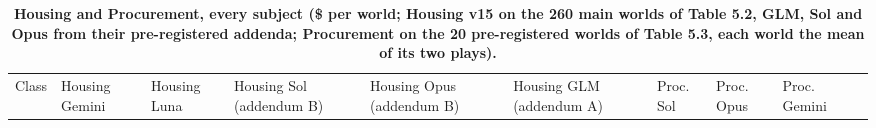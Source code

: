 \renewcommand{\thetable}{E.5}
\begin{longtable}[]{@{}
  >{\raggedright\arraybackslash}p{}
  >{\raggedleft\arraybackslash}p{}
  >{\raggedleft\arraybackslash}p{}
  >{\raggedleft\arraybackslash}p{}
  >{\raggedleft\arraybackslash}p{}
  >{\raggedleft\arraybackslash}p{}
  >{\raggedleft\arraybackslash}p{}
  >{\raggedleft\arraybackslash}p{}
  >{\raggedleft\arraybackslash}p{}
  >{\raggedleft\arraybackslash}p{}@{}}
\caption{\textbf{Housing and Procurement, every subject (\$ per world; Housing v15 on the 260 main worlds of Table 5.2, GLM, Sol and Opus from their pre-registered addenda; Procurement on the 20 pre-registered worlds of Table 5.3, each world the mean of its two plays).}}\label{tab:E.5}\tabularnewline
\toprule\noalign{}
\begin{minipage}[b]{\linewidth}\raggedright
Class
\end{minipage} & \begin{minipage}[b]{\linewidth}\raggedleft
Housing Gemini
\end{minipage} & \begin{minipage}[b]{\linewidth}\raggedleft
Housing Luna
\end{minipage} & \begin{minipage}[b]{\linewidth}\raggedleft
Housing Sol (addendum B)
\end{minipage} & \begin{minipage}[b]{\linewidth}\raggedleft
Housing Opus (addendum B)
\end{minipage} & \begin{minipage}[b]{\linewidth}\raggedleft
Housing GLM (addendum A)
\end{minipage} & \begin{minipage}[b]{\linewidth}\raggedleft
Proc. Sol
\end{minipage} & \begin{minipage}[b]{\linewidth}\raggedleft
Proc. Opus
\end{minipage} & \begin{minipage}[b]{\linewidth}\raggedleft
Proc. Gemini
\end{minipage} & \begin{minipage}[b]{\linewidth}\raggedleft

\end{minipage}
\end{longtable}
